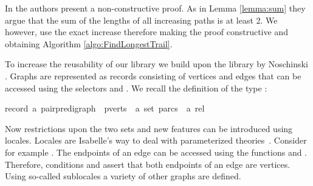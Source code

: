 \begin{isabellebody}
\begin{isamarkuptext}
In \cite{graham1973increasing} the authors present a non-constructive proof. As in Lemma \ref{lemma:sum} they argue that the 
sum of the lengths of all increasing paths is at least 2. We however, use the exact increase therefore 
making the proof constructive and obtaining Algorithm \ref{algo:FindLongestTrail}.%
\end{isamarkuptext}\isamarkuptrue%
%
\isadelimdocument
%
\endisadelimdocument
%
\isatagdocument
%
\isamarkuptrue%
%
\endisatagdocument
{\isafolddocument}%
%
\isadelimdocument
%
\endisadelimdocument
%
\begin{isamarkuptext}%
\label{section:Formalization}%
\end{isamarkuptext}\isamarkuptrue%
%
\isadelimdocument
%
\endisadelimdocument
%
\isatagdocument
%
\isamarkuptrue%
%
\endisatagdocument
{\isafolddocument}%
%
\isadelimdocument
%
\endisadelimdocument
%
\begin{isamarkuptext}%
\label{section:GraphTheory} To increase the reusability of our library we build upon the 
library by Noschinski \cite{Graph_Theory-AFP}. Graphs are represented as records consisting of vertices and edges that
can be accessed using the selectors  and . We recall the definition 
of the type :

\begin{isabelle}%
record\ {\isacharprime}a\ pair{\isacharunderscore}pre{\isacharunderscore}digraph\ {\isacharequal}\ pverts\ {\isacharcolon}{\isacharcolon}\ {\isachardoublequote}{\isacharprime}a\ set{\isachardoublequote}\ parcs\ {\isacharcolon}{\isacharcolon}\ {\isachardoublequote}{\isacharprime}a\ rel{\isachardoublequote}%
\end{isabelle}

Now restrictions upon the two sets and new features can be introduced using locales. 
Locales are Isabelle's way to deal with parameterized theories~\cite{ballarin2010tutorial}. Consider
for example .
The endpoints of an edge can be accessed using the functions  and . Therefore, conditions
 and  assert that both endpoints of an edge are
vertices. Using so-called sublocales a variety of other graphs are defined.  


\end{isamarkuptext}
\end{isabellebody}
